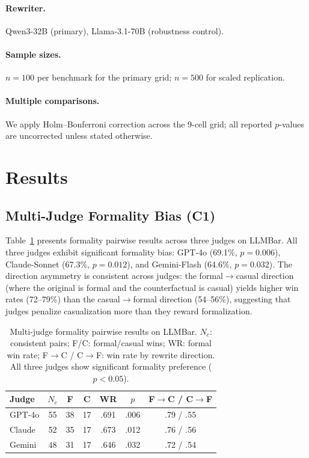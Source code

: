 \documentclass[11pt]{article}
\begin{document}
\paragraph{Rewriter.} Qwen3-32B (primary), Llama-3.1-70B (robustness control).
\paragraph{Sample sizes.} $n = 100$ per benchmark for the primary grid; $n = 500$ for scaled replication.
\paragraph{Multiple comparisons.} We apply Holm--Bonferroni correction across the 9-cell grid; all reported $p$-values are uncorrected unless stated otherwise.

\section{Results}

\subsection{Multi-Judge Formality Bias (C1)}
\label{sec:multijudge}

Table~\ref{tab:multijudge} presents formality pairwise results across three judges on LLMBar.
All three judges exhibit significant formality bias: GPT-4o (69.1\%, $p = 0.006$), Claude-Sonnet (67.3\%, $p = 0.012$), and Gemini-Flash (64.6\%, $p = 0.032$).
The direction asymmetry is consistent across judges: the formal$\to$casual direction (where the original is formal and the counterfactual is casual) yields higher win rates (72--79\%) than the casual$\to$formal direction (54--56\%), suggesting that judges penalize casualization more than they reward formalization.

\begin{table}[t]
\centering
\small
\begin{tabular}{lcccccc}
\toprule
\textbf{Judge} & \textbf{$N_c$} & \textbf{F} & \textbf{C} & \textbf{WR} & \textbf{$p$} & \textbf{F$\to$C / C$\to$F} \\
\midrule
GPT-4o & 55 & 38 & 17 & .691 & .006 & .79 / .55 \\
Claude & 52 & 35 & 17 & .673 & .012 & .76 / .56 \\
Gemini & 48 & 31 & 17 & .646 & .032 & .72 / .54 \\
\bottomrule
\end{tabular}
\caption{Multi-judge formality pairwise results on LLMBar. $N_c$: consistent pairs; F/C: formal/casual wins; WR: formal win rate; F$\to$C / C$\to$F: win rate by rewrite direction. All three judges show significant formality preference ($p < 0.05$).}
\label{tab:multijudge}
\end{table}
\end{document}
